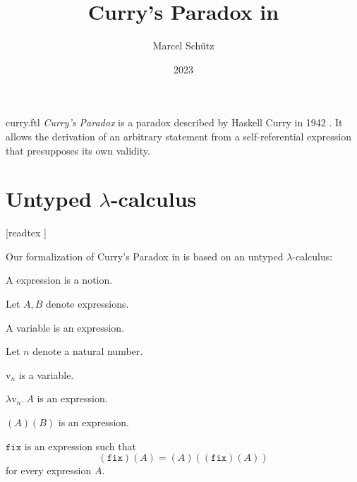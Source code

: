 \documentclass{stex}
\newcommand{\var}[1]{\mathrm{v}_{#1}}
\newcommand{\abs}[2]{\lambda\var{#1}.\ #2}
\newcommand{\app}[2]{(#1)(#2)}
\newcommand{\fix}{\mathtt{fix}}
\begin{document}
\title{Curry's Paradox in \Naproche}
\author{Marcel Schütz}
\date{2023}
\maketitle
\begin{smodule}{curry.ftl}
  \noindent \emph{Curry's Paradox} is a paradox described by Haskell Curry in 1942 \cite{Curry1942}.
  It allows the derivation of an arbitrary statement from a self-referential expression that presupposes its own validity.

  \section*{Untyped $\lambda$-calculus}

  \begin{forthel}
    [readtex ]
  \end{forthel}

  \noindent Our formalization of Curry's Paradox in \Naproche is based on an untyped $\lambda$-calculus:

  \begin{forthel}
    \begin{signature*}
      A expression is a notion.
    \end{signature*}

    Let $A, B$ denote expressions.

    \begin{signature*}
      A variable is an expression.
    \end{signature*}

    Let $n$ denote a natural number.

    \begin{signature*}
      $\var{n}$ is a variable.
    \end{signature*}

    \begin{signature*}[Abstraction]\label{abstraction}
      $\abs{n}{A}$ is an expression.
    \end{signature*}

    \begin{signature*}[Application]\label{application}
      $\app{A}{B}$ is an expression.
    \end{signature*}

    \begin{signature*}\label{fixed_point_combinator}
      $\fix$ is an expression such that
      \[\app{\fix}{A} = \app{A}{\app{\fix}{A}}\]
      for every expression $A$.
    \end{signature*}
  \end{forthel}



\end{smodule}
\end{document}
